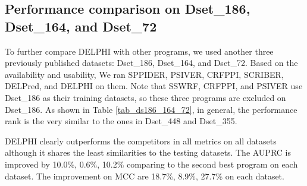 \subsection{Performance comparison on Dset\_186, Dset\_164, and Dset\_72}
To further compare DELPHI with other programs, we used another three previously published datasets: Dset\_186, Dset\_164, and Dset\_72. Based on the availability and usability, We ran SPPIDER, PSIVER, CRFPPI, SCRIBER, DELPred, and DELPHI on them. Note that SSWRF, CRFPPI, and PSIVER use Dset\_186 as their training datasets, so these three programs are excluded on Dset\_186. As shown in Table \ref{tab_ds186_164_72}, in general, the performance rank is the very similar to the ones in Dset\_448 and Dset\_355.

DELPHI clearly outperforms the competitors in all metrics on all datasets although it shares the least similarities to the testing datasets.  The AUPRC is improved by 10.0\%, 0.6\%, 10.2\% comparing to the second best program on each dataset. The improvement on MCC are 18.7\%, 8.9\%, 27.7\% on each dataset. 
